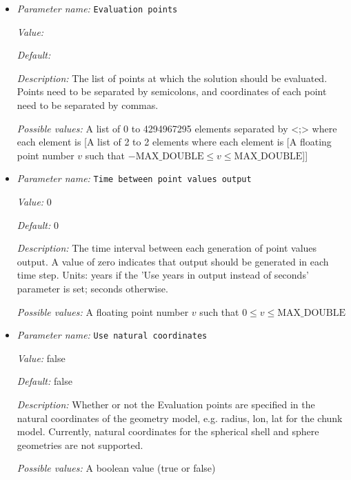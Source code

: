 \begin{itemize}
\item {\it Parameter name:} {\tt Evaluation points}
\label{parameters:Postprocess/Point values/Evaluation points}


{\it Value:} 


{\it Default:} 


{\it Description:} The list of points at which the solution should be evaluated. Points need to be separated by semicolons, and coordinates of each point need to be separated by commas.


{\it Possible values:} A list of 0 to 4294967295 elements separated by <;> where each element is [A list of 2 to 2 elements where each element is [A floating point number $v$ such that $-\text{MAX\_DOUBLE} \leq v \leq \text{MAX\_DOUBLE}$]]
\item {\it Parameter name:} {\tt Time between point values output}
\label{parameters:Postprocess/Point values/Time between point values output}


{\it Value:} 0


{\it Default:} 0


{\it Description:} The time interval between each generation of point values output. A value of zero indicates that output should be generated in each time step. Units: years if the 'Use years in output instead of seconds' parameter is set; seconds otherwise.


{\it Possible values:} A floating point number $v$ such that $0 \leq v \leq \text{MAX\_DOUBLE}$
\item {\it Parameter name:} {\tt Use natural coordinates}
\label{parameters:Postprocess/Point values/Use natural coordinates}


{\it Value:} false


{\it Default:} false


{\it Description:} Whether or not the Evaluation points are specified in the natural coordinates of the geometry model, e.g. radius, lon, lat for the chunk model. Currently, natural coordinates for the spherical shell and sphere geometries are not supported. 


{\it Possible values:} A boolean value (true or false)
\end{itemize}

